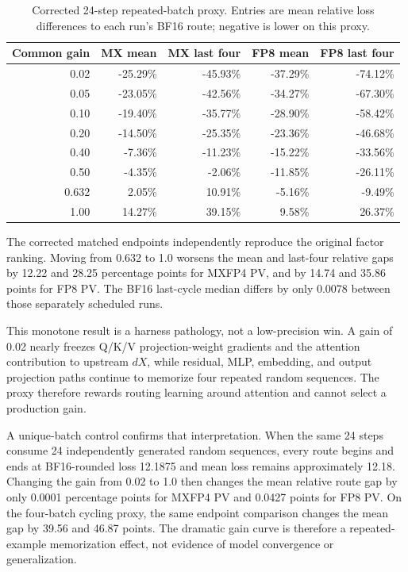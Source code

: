 \begin{table}[htbp]
\centering
\caption{Corrected 24-step repeated-batch proxy.  Entries are mean relative
loss differences to each run's BF16 route; negative is lower on this proxy.}
\label{tab:clean-gain-sweep}
\small
\begin{tabular}{r rr rr}
\toprule
Common gain & MX mean & MX last four & FP8 mean & FP8 last four \\
\midrule
0.02 & -25.29\% & -45.93\% & -37.29\% & -74.12\% \\
0.05 & -23.05\% & -42.56\% & -34.27\% & -67.30\% \\
0.10 & -19.40\% & -35.77\% & -28.90\% & -58.42\% \\
0.20 & -14.50\% & -25.35\% & -23.36\% & -46.68\% \\
0.40 &  -7.36\% & -11.23\% & -15.22\% & -33.56\% \\
0.50 &  -4.35\% &  -2.06\% & -11.85\% & -26.11\% \\
0.632 &  2.05\% & 10.91\% & -5.16\% & -9.49\% \\
1.00 & 14.27\% & 39.15\% &  9.58\% & 26.37\% \\
\bottomrule
\end{tabular}
\end{table}

The corrected matched endpoints independently reproduce the original factor
ranking.  Moving from 0.632 to 1.0 worsens the mean and last-four relative
gaps by 12.22 and 28.25 percentage points for MXFP4 PV, and by 14.74 and
35.86 points for FP8 PV.  The BF16 last-cycle median differs by only 0.0078
between those separately scheduled runs.

This monotone result is a harness pathology, not a low-precision win.  A gain
of 0.02 nearly freezes Q/K/V projection-weight gradients and the attention
contribution to upstream $dX$, while residual, MLP, embedding, and output
projection paths continue to memorize four repeated random sequences.  The
proxy therefore rewards routing learning around attention and cannot select
a production gain.

A unique-batch control confirms that interpretation.  When the same 24 steps
consume 24 independently generated random sequences, every route begins and
ends at BF16-rounded loss 12.1875 and mean loss remains approximately 12.18.
Changing the gain from 0.02 to 1.0 then changes the mean relative route gap by
only 0.0001 percentage points for MXFP4 PV and 0.0427 points for FP8 PV.  On
the four-batch cycling proxy, the same endpoint comparison changes the mean
gap by 39.56 and 46.87 points.  The dramatic gain curve is therefore a
repeated-example memorization effect, not evidence of model convergence or
generalization.

